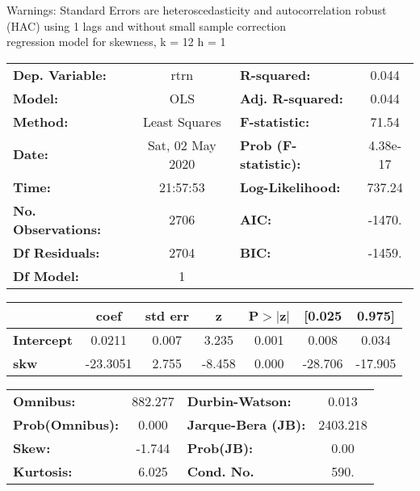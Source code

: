 Warnings: \newline
 [1] Standard Errors are heteroscedasticity and autocorrelation robust (HAC) using 1 lags and without small sample correction\\ 

regression model for skewness, k = 12 h = 1\begin{center}
\begin{tabular}{lclc}
\toprule
\textbf{Dep. Variable:}    &       rtrn       & \textbf{  R-squared:         } &     0.044   \\
\textbf{Model:}            &       OLS        & \textbf{  Adj. R-squared:    } &     0.044   \\
\textbf{Method:}           &  Least Squares   & \textbf{  F-statistic:       } &     71.54   \\
\textbf{Date:}             & Sat, 02 May 2020 & \textbf{  Prob (F-statistic):} &  4.38e-17   \\
\textbf{Time:}             &     21:57:53     & \textbf{  Log-Likelihood:    } &    737.24   \\
\textbf{No. Observations:} &        2706      & \textbf{  AIC:               } &    -1470.   \\
\textbf{Df Residuals:}     &        2704      & \textbf{  BIC:               } &    -1459.   \\
\textbf{Df Model:}         &           1      & \textbf{                     } &             \\
\bottomrule
\end{tabular}
\begin{tabular}{lcccccc}
                   & \textbf{coef} & \textbf{std err} & \textbf{z} & \textbf{P$> |$z$|$} & \textbf{[0.025} & \textbf{0.975]}  \\
\midrule
\textbf{Intercept} &       0.0211  &        0.007     &     3.235  &         0.001        &        0.008    &        0.034     \\
\textbf{skw}       &     -23.3051  &        2.755     &    -8.458  &         0.000        &      -28.706    &      -17.905     \\
\bottomrule
\end{tabular}
\begin{tabular}{lclc}
\textbf{Omnibus:}       & 882.277 & \textbf{  Durbin-Watson:     } &    0.013  \\
\textbf{Prob(Omnibus):} &   0.000 & \textbf{  Jarque-Bera (JB):  } & 2403.218  \\
\textbf{Skew:}          &  -1.744 & \textbf{  Prob(JB):          } &     0.00  \\
\textbf{Kurtosis:}      &   6.025 & \textbf{  Cond. No.          } &     590.  \\
\bottomrule
\end{tabular}
\end{center}

